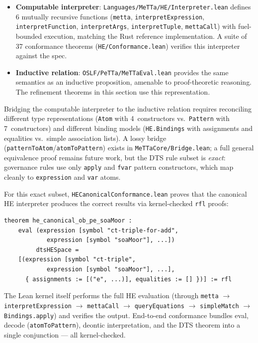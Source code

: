 \documentclass[]{article}
\newcommand{\code}[1]{\texttt{#1}}
\begin{document}
\begin{itemize}
\item \textbf{Computable interpreter}: \code{Languages/MeTTa/HE/Interpreter.lean}
      defines 6 mutually recursive functions (\code{metta},
      \code{interpretExpression}, \code{interpretFunction},
      \code{interpretArgs}, \code{interpretTuple}, \code{mettaCall})
      with fuel-bounded execution, matching the Rust reference implementation.
      A suite of 37 conformance theorems
      (\code{HE/Conformance.lean}) verifies this interpreter against the spec.
\item \textbf{Inductive relation}: \code{OSLF/PeTTa/MeTTaEval.lean} provides
      the same semantics as an inductive proposition, amenable to
      proof-theoretic reasoning.  The refinement theorems in this section
      use this representation.
\end{itemize}

\noindent
Bridging the computable interpreter to the inductive relation requires
reconciling different type representations (\code{Atom} with 4~constructors
vs.\ \code{Pattern} with 7~constructors) and different binding models
(\code{HE.Bindings} with assignments and equalities vs.\ simple association
lists).  A lossy bridge (\code{patternToAtom}/\code{atomToPattern}) exists
in \code{MeTTaCore/Bridge.lean}; a full general equivalence proof remains
future work, but the DTS rule subset is \emph{exact}: governance rules
use only \code{apply} and \code{fvar} pattern constructors, which map
cleanly to \code{expression} and \code{var} atoms.

For this exact subset, \code{HECanonicalConformance.lean} proves that the
canonical HE interpreter produces the correct results via kernel-checked
\code{rfl} proofs:

\begin{lstlisting}
theorem he_canonical_ob_pe_soaMoor :
    eval (expression [symbol "ct-triple-for-add",
            expression [symbol "soaMoor"], ...])
         dtsHESpace =
    [(expression [symbol "ct-triple",
            expression [symbol "soaMoor"], ...],
      { assignments := [("e", ...)], equalities := [] })] := rfl
\end{lstlisting}

\noindent
The Lean kernel itself performs the full HE evaluation (through \code{metta}
$\to$ \code{interpretExpression} $\to$ \code{mettaCall} $\to$
\code{queryEquations} $\to$ \code{simpleMatch} $\to$ \code{Bindings.apply})
and verifies the output.  End-to-end conformance bundles eval, decode
(\code{atomToPattern}), deontic interpretation, and the DTS theorem into
a single conjunction --- all kernel-checked.
\end{document}
